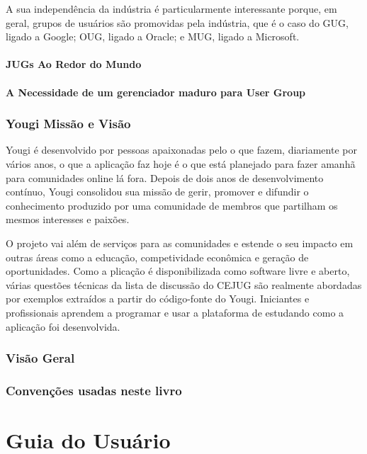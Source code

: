 \documentclass[envcountsame,envcountchap,letterpaper]{svmono}
\begin{document}
A sua independência da indústria é particularmente interessante porque, em geral, grupos de usuários são promovidas pela indústria, que é o caso do GUG, ligado a Google; OUG, ligado a Oracle; e MUG, ligado a Microsoft.

\subsection{JUGs Ao Redor do Mundo}

\subsection{A Necessidade de um gerenciador maduro para User Group}

\section{Yougi Missão e Visão}

Yougi é desenvolvido por pessoas apaixonadas pelo o que fazem, diariamente por vários anos, o que a aplicação faz hoje é o que está planejado para fazer amanhã para comunidades online lá fora. Depois de dois anos de desenvolvimento contínuo, Yougi consolidou sua missão de gerir, promover e difundir o conhecimento produzido por uma comunidade de membros que partilham os mesmos interesses e paixões.

O projeto vai além de serviços para as comunidades e estende o seu impacto em outras áreas como a educação, competividade econômica e geração de oportunidades. Como a plicação é disponibilizada como software livre e aberto, várias questões técnicas da lista de discussão do CEJUG são realmente abordadas por exemplos extraídos a partir do código-fonte do Yougi. Iniciantes e profissionais aprendem a programar e usar a plataforma de estudando como a aplicação foi desenvolvida.

\section{Visão Geral}

\section{Convenções usadas neste livro}

\part{Guia do Usuário}
\end{document}
